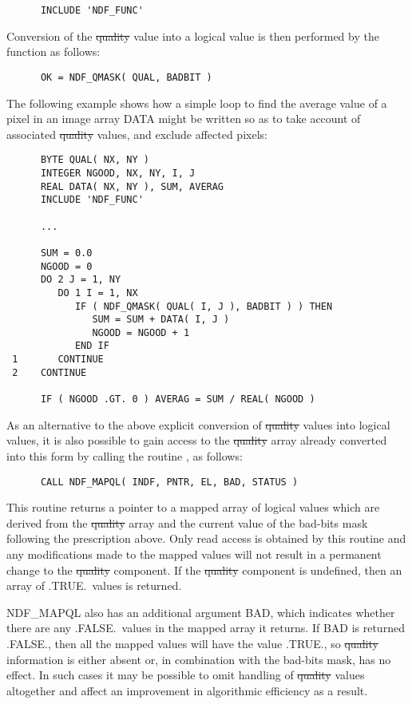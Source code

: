 \small
\begin{verbatim}
      INCLUDE 'NDF_FUNC'
\end{verbatim}
\normalsize

Conversion of the \st{quality\/} value into a logical value is then performed by 
the function as follows:

\small
\begin{verbatim}
      OK = NDF_QMASK( QUAL, BADBIT )
\end{verbatim}
\normalsize

The following example shows how a simple loop to find the average value of
a pixel in an image array DATA might be written so as to take account of
associated \st{quality\/} values, and exclude affected pixels: 

\small
\begin{verbatim}
      BYTE QUAL( NX, NY )
      INTEGER NGOOD, NX, NY, I, J
      REAL DATA( NX, NY ), SUM, AVERAG
      INCLUDE 'NDF_FUNC'

      ...

      SUM = 0.0
      NGOOD = 0
      DO 2 J = 1, NY
         DO 1 I = 1, NX
            IF ( NDF_QMASK( QUAL( I, J ), BADBIT ) ) THEN
               SUM = SUM + DATA( I, J )
               NGOOD = NGOOD + 1
            END IF
 1       CONTINUE
 2    CONTINUE

      IF ( NGOOD .GT. 0 ) AVERAG = SUM / REAL( NGOOD )
\end{verbatim}      
\normalsize

As an alternative to the above explicit conversion of \st{quality\/} values into 
logical values, it is also possible to gain access to the \st{quality\/} array 
already converted into this form by calling the routine , as 
follows:

\small
\begin{verbatim}
      CALL NDF_MAPQL( INDF, PNTR, EL, BAD, STATUS )
\end{verbatim}
\normalsize

This routine returns a pointer to a mapped array of logical values which are 
derived from the \st{quality\/} array and the current value of the bad-bits mask 
following the prescription above.
Only read access is obtained by this routine and any modifications made to 
the mapped values will not result in a permanent change to the \st{quality\/}
component.
If the \st{quality\/} component is undefined, then an array of .TRUE.\ values is
returned. 

NDF\_MAPQL also has an additional argument BAD, which indicates whether 
there are any .FALSE.\ values in the mapped array it returns.
If BAD is returned .FALSE., then all the mapped values will have the value 
.TRUE., so \st{quality\/} information is either absent or, in combination with
the bad-bits mask, has no effect.
In such cases it may be possible to omit handling of \st{quality\/} values 
altogether and affect an improvement in algorithmic efficiency as a result.

